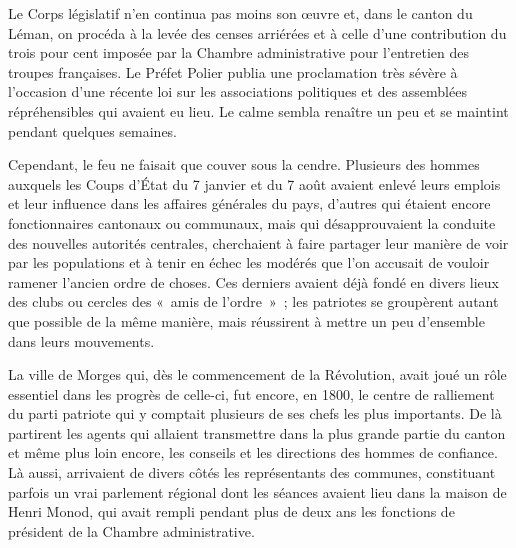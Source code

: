 \documentclass[french,twoside]{book} %
\begin{document}
\noindent Le Corps législatif n’en continua pas moins son œuvre et, dans le canton du Léman, on procéda à la levée des censes arriérées et à celle d’une contribution du trois pour cent imposée par la Chambre administrative pour l’entretien des troupes françaises. Le Préfet Polier publia une proclamation très sévère à l’occasion d’une récente loi sur les associations politiques et des assemblées répréhensibles qui avaient eu lieu. Le calme sembla renaître un peu et se maintint pendant quelques semaines.\par
Cependant, le feu ne faisait que couver sous la cendre. Plusieurs des hommes auxquels les Coups d’État du 7 janvier et du 7 août avaient enlevé leurs emplois et leur influence dans les affaires générales du pays, d’autres qui étaient encore fonctionnaires cantonaux ou communaux, mais qui désapprouvaient la conduite des nouvelles autorités centrales, cherchaient à faire partager leur manière de voir par les populations et à tenir en échec les modérés que l’on accusait de vouloir ramener l’ancien ordre de choses. Ces derniers avaient déjà fondé en divers lieux des clubs ou cercles des « amis de l’ordre » ; les patriotes se groupèrent autant que possible de la même manière, mais réussirent à mettre un peu d’ensemble dans leurs mouvements.\par
La ville de Morges qui, dès le commencement de la Révolution, avait joué un rôle essentiel dans les progrès de celle-ci, fut encore, en 1800, le centre de ralliement du parti patriote qui y comptait plusieurs de ses chefs les plus importants. De là partirent les agents qui allaient transmettre dans la plus grande partie du canton et même plus loin encore, les conseils et les directions des hommes de confiance. Là aussi, arrivaient de divers côtés les représentants des communes, constituant parfois un vrai parlement régional dont les séances avaient lieu dans la maison de Henri Monod, qui avait rempli pendant plus de deux ans les fonctions de président de la Chambre administrative.\par
\end{document}
